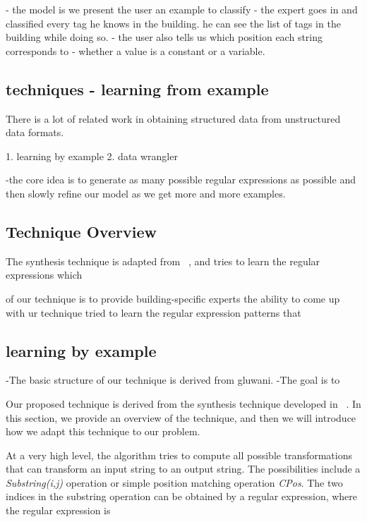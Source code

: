 - the model is we present the user an example to classify
- the expert goes in and classified every tag he knows in the building. he can see the list of tags in the building while doing so. 
- the user also tells us which position each string corresponds to 
- whether a value is a constant or a variable.

\subsection{techniques - learning from example}

There is a lot of related work in obtaining structured data from unstructured data formats. 

1. learning by example
2. data wrangler

-the core idea is to generate as many possible regular expressions as possible and then slowly refine our model as we get more and more examples.



\subsection{Technique Overview}

The synthesis technique is adapted from ~\cite{gulwani}, and tries to learn the regular expressions which 

of our technique is to provide building-specific experts the ability to come up with ur technique tried to learn the regular expression patterns that 
\subsection{learning by example}

-The basic structure of our technique is derived from gluwani.
-The goal is to 

Our proposed technique is derived from the synthesis technique developed in ~\cite{}. In this section, we provide an overview of the technique, and then we will introduce how we adapt this technique to our problem. 

At a very high level, the algorithm tries to compute all possible transformations that can transform an input string to an output string. The possibilities include a {\it Substring(i,j)} operation or simple position matching operation {\it{CPos}}. The two indices in the substring operation can be obtained by a regular expression, where the regular expression is  




